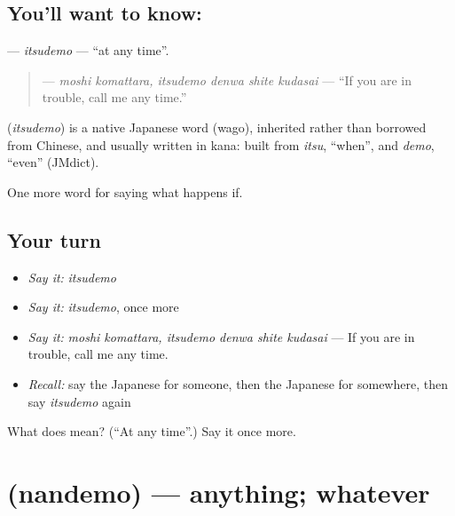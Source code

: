 \subsection*{You'll want to know: }
\textbf{} — \emph{itsudemo} — \textquotedblleft{}at any time\textquotedblright{}.

\begin{quote}
\textbf{   } — \emph{moshi komattara, itsudemo denwa shite kudasai} — \textquotedblleft{}If you are in trouble, call me any time.\textquotedblright{}
\end{quote}

\begin{cousinweb}
\textbf{} (\emph{itsudemo}) is a native Japanese word (wago), inherited rather than borrowed from Chinese, and usually written in kana: built from \emph{itsu}, \textquotedblleft{}when\textquotedblright{}, and \emph{demo}, \textquotedblleft{}even\textquotedblright{} (JMdict).
\end{cousinweb}

\begin{grammarlens}[title={What you've built}]
One more word for saying what happens if.
\end{grammarlens}

\subsection*{Your turn}
\begin{itemize}
\raggedright
  \item \emph{Say it:} \emph{itsudemo}
  \item \emph{Say it:} \emph{itsudemo}, once more
  \item \emph{Say it:} \emph{moshi komattara, itsudemo denwa shite kudasai} — If you are in trouble, call me any time.
  \item \emph{Recall:} say the Japanese for someone, then the Japanese for somewhere, then say \emph{itsudemo} again
\end{itemize}

\begin{tcolorbox}[breakable,colback=teal!4,colframe=teal!35!black,title={Before you move on}]
What does  mean? (\textquotedblleft{}At any time\textquotedblright{}.) Say it once more.
\end{tcolorbox}
\section[\texorpdfstring{\ja{なんでも} (nandemo)}{なんでも (nandemo)}]{ (nandemo) — anything; whatever}


